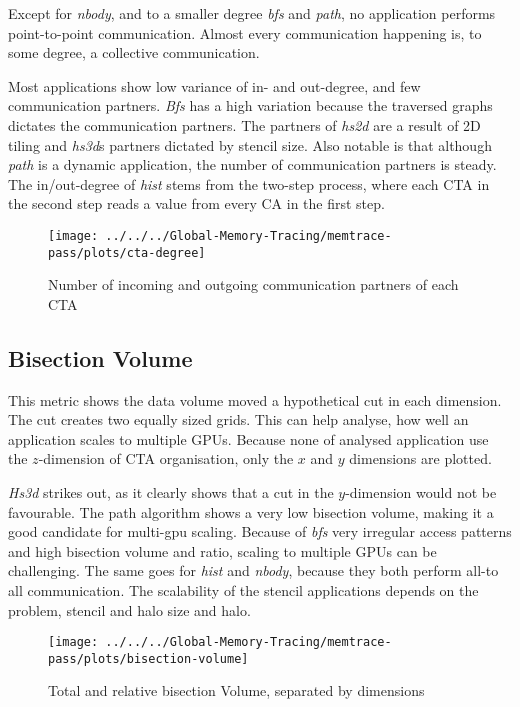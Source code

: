 Except for \textit{nbody}, and to a smaller degree \textit{bfs} and \textit{path}, no application performs point-to-point communication. Almost every communication happening is, to some degree, a collective communication.

Most applications show low variance of in- and out-degree, and few communication partners. \textit{Bfs} has a high variation because the traversed graphs dictates the communication partners. The partners of \textit{hs2d} are a result of 2D tiling and \textit{hs3d}s partners
dictated by stencil size. Also notable is that although \textit{path} is a dynamic application, the number of communication partners is steady. The in/out-degree of \textit{hist} stems from the two-step process, where each CTA in the second step reads a value from
every CA in the first step.

\begin{figure}[t]
	\texttt{[image: ../../../Global-Memory-Tracing/memtrace-pass/plots/cta-degree]}
	\caption{Number of incoming and outgoing communication partners of each CTA}
	\label{fig:Cta-degree}
\end{figure}
\subsection{Bisection Volume}
This metric shows the data volume moved a hypothetical cut in each dimension. The cut creates two equally sized grids. This can help analyse, how well an application scales to multiple GPUs. Because none of analysed application use the $z$-dimension of CTA organisation, only the $x$ and $y$ dimensions are plotted. 

\textit{Hs3d} strikes out, as it clearly shows that a cut in the $y$-dimension would not be favourable. The path algorithm shows a very low bisection volume, making it a good candidate for multi-gpu scaling.
Because of \textit{bfs} very irregular access patterns and high bisection volume and ratio, scaling to multiple GPUs can be challenging. The same goes for \textit{hist} and \textit{nbody}, because they both
perform all-to all communication. The scalability of the stencil applications depends on the problem, stencil and halo size and halo.
\begin{figure}[t]
	\centering
	\texttt{[image: ../../../Global-Memory-Tracing/memtrace-pass/plots/bisection-volume]}
	\caption{Total and relative bisection Volume, separated by dimensions}
	\label{bisection-vols}
\end{figure}
